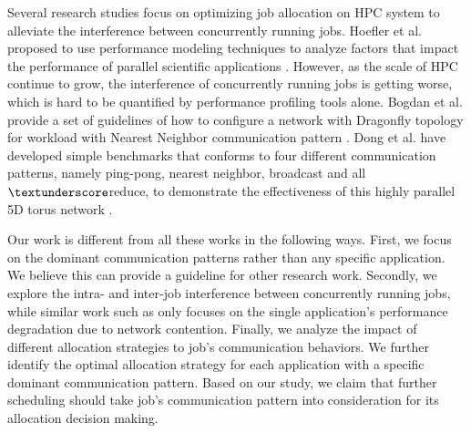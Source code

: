 Several research studies focus on optimizing job allocation on HPC system to alleviate the interference between concurrently running jobs. Hoefler et al. proposed to use performance modeling techniques to analyze factors that impact the performance of parallel scientific applications \cite{hoefler-modeling}. However, as the scale of HPC continue to grow, the interference of concurrently running jobs is getting worse, which is hard to be quantified by performance profiling tools alone. Bogdan et al. provide a set of guidelines of how to configure a network with Dragonfly topology for workload with Nearest Neighbor communication pattern \cite{Bogdan-hpdc14}. Dong et al. have developed simple benchmarks that conforms to four different communication patterns, namely ping-pong, nearest neighbor, broadcast and all$\textunderscore$reduce, to demonstrate the effectiveness of this highly parallel 5D torus network \cite{Dong-SC11}.

Our work is different from all these works in the following ways. First, we focus on the dominant communication patterns rather than any specific application. We believe this can provide a guideline for other research work. Secondly, we explore the intra- and inter-job interference between concurrently running jobs, while similar work such as \cite{abhinav-sc13} only focuses on the single application's performance degradation due to network contention. Finally, we analyze the impact of different allocation strategies to job's communication behaviors. We further identify the optimal allocation strategy for each application with a specific dominant communication pattern. Based on our study, we claim that further scheduling should take job's communication pattern into consideration for its allocation decision making. 

